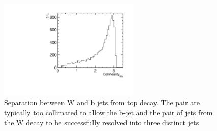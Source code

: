 \begin{figure}
  \centering
  \includegraphics[width=0.6\textwidth]{TopAnalysis/figures/WBCollinearity}
  \caption[Separation between W and b jet from top decay]{Separation between W and b jets from top decay. The pair are typically too collimated to allow the b-jet and the pair of jets from the W decay to be successfully resolved into three distinct jets}
  \label{fig:Collimated}
\end{figure}


